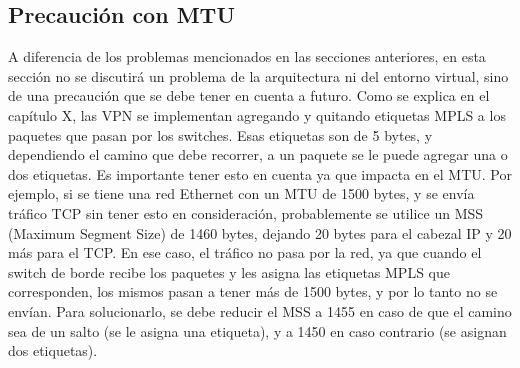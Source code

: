 \subsection{Precaución con MTU}
A diferencia de los problemas mencionados en las secciones anteriores, en esta sección no se discutirá un problema de la arquitectura ni del entorno virtual, sino de una precaución que se debe tener en cuenta a futuro. Como se explica en el capítulo X, las VPN se implementan agregando y quitando etiquetas MPLS a los paquetes que pasan por los switches. Esas etiquetas son de 5 bytes, y dependiendo el camino que debe recorrer, a un paquete se le puede agregar una o dos etiquetas. Es importante tener esto en cuenta ya que impacta en el MTU. Por ejemplo, si se tiene una red Ethernet con un MTU de 1500 bytes, y se envía tráfico TCP sin tener esto en consideración, probablemente se utilice un MSS (Maximum Segment Size) de 1460 bytes, dejando 20 bytes para el cabezal IP y 20 más para el TCP. En ese caso, el tráfico no pasa por la red, ya que cuando el switch de borde recibe los paquetes y les asigna las etiquetas MPLS que corresponden, los mismos pasan a tener más de 1500 bytes, y por lo tanto no se envían. Para solucionarlo, se debe reducir el MSS a 1455 en caso de que el camino sea de un salto (se le asigna una etiqueta), y a 1450 en caso contrario (se asignan dos etiquetas).
